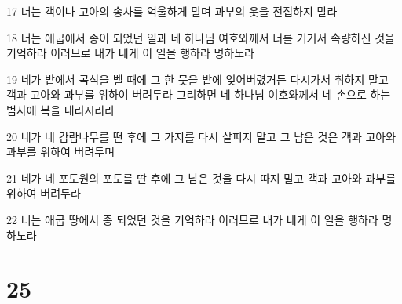 \par 17 너는 객이나 고아의 송사를 억울하게 말며 과부의 옷을 전집하지 말라
\par 18 너는 애굽에서 종이 되었던 일과 네 하나님 여호와께서 너를 거기서 속량하신 것을 기억하라 이러므로 내가 네게 이 일을 행하라 명하노라
\par 19 네가 밭에서 곡식을 벨 때에 그 한 뭇을 밭에 잊어버렸거든 다시가서 취하지 말고 객과 고아와 과부를 위하여 버려두라 그리하면 네 하나님 여호와께서 네 손으로 하는 범사에 복을 내리시리라
\par 20 네가 네 감람나무를 떤 후에 그 가지를 다시 살피지 말고 그 남은 것은 객과 고아와 과부를 위하여 버려두며
\par 21 네가 네 포도원의 포도를 딴 후에 그 남은 것을 다시 따지 말고 객과 고아와 과부를 위하여 버려두라
\par 22 너는 애굽 땅에서 종 되었던 것을 기억하라 이러므로 내가 네게 이 일을 행하라 명하노라

\chapter{25}

